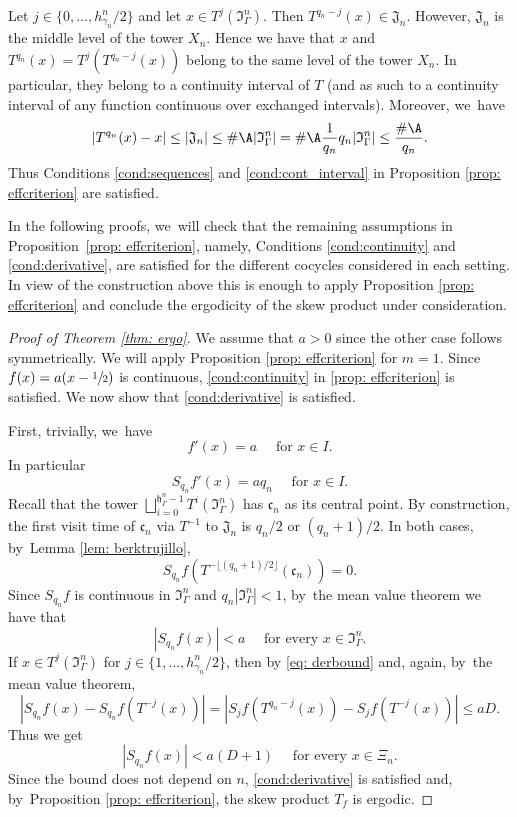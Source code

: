 Let $j\in\{0,\ldots,h_{\gamma_n}^n/2\}$ and let $x\in T^j(\mathfrak I_{\Gamma}^n)$. Then $T^{q_n-j}(x)\in \mathfrak J_n$. However, $\mathfrak J_n$ is the middle level of the tower $X_n$. Hence we have that $x$
and $T^{q_n}(x)=T^{j}(T^{q_n-j}(x))$ belong to the same level of the tower $X_n$. In particular, they belong to a continuity interval of $T$ (and as such to a continuity interval of any function continuous over exchanged intervals). Moreover, we~have
\[
|T^{q_n}(x)-x|\le |\mathfrak J_n|\le \#\A|\mathfrak I_{\Gamma}^n|=
\#\A\frac{1}{q_n} q_n|\mathfrak I_{\Gamma}^n|\le \frac{\#\A}{q_n}.
\]
Thus Conditions \eqref{cond:sequences} and \eqref{cond:cont_interval} in Proposition \ref{prop: effcriterion} are satisfied.

In the following proofs, we~will check that the remaining assumptions in Proposition~\ref{prop: effcriterion}, namely, Conditions \eqref{cond:continuity} and \eqref{cond:derivative}, are satisfied for the different cocycles considered in each setting. In view of the construction above this is enough to apply Proposition \ref{prop: effcriterion} and conclude the ergodicity of the skew product under consideration.

\begin{proof}[Proof of Theorem \ref{thm: ergo}]
We assume that $a>0$ since the other case follows symmetrically. We will apply Proposition \ref{prop: effcriterion} for $m=1$. Since $f(x)=a(x-\sfrac{1}{2})$ is continuous, \eqref{cond:continuity} in \ref{prop: effcriterion} is satisfied. We now show that \eqref{cond:derivative} is satisfied.

First, trivially, we~have
\[
f'(x)=a\quad\text{ for }x\in I.
\]
In particular
\[
S_{q_n} f'(x)=aq_n\quad \text{ for }x\in I.
\]
Recall that the tower $\bigsqcup_{i=0}^{\mathfrak h_{\Gamma}^n-1}T^i(\mathfrak I_{\Gamma}^n)$ has $\mathfrak c_n$ as its central point. By construction, the first visit time of $\mathfrak c_n$ via $T^{-1}$ to $\mathfrak J_n$ is $q_{n}/2$ or $(q_n+1)/2$. In both cases, by~Lemma \ref{lem: berktrujillo},
\[
S_{q_n}f(T^{-\lfloor (q_n+1)/2\rfloor}(\mathfrak c_n))=0.
\]
Since $S_{q_n}f$ is continuous in $\mathfrak I_{\Gamma}^n$ and $q_n|\mathfrak I_{\Gamma}^n|<1$, by~the mean value theorem we have that
\[
\left|S_{q_n}f(x)\right|<a\quad \text{ for every }x\in \mathfrak I_{\Gamma}^n.
\]
If $x\in T^j(\mathfrak I_{\Gamma}^n)$ for $j\in \{1,\ldots,h_{\gamma_n}^n/2\}$, then by \eqref{eq: derbound} and, again, by~the mean value theorem,
\[
\left|S_{q_n}f(x)-S_{q_n}f(T^{-j}(x)) \right|=
\left|S_j f(T^{q_n-j}(x))-S_j f(T^{-j}(x)) \right|
\le a D.
\]
Thus we get
\[
\left|S_{q_n}f(x)\right|<a(D+1) \quad \text{ for every }x\in\Xi_n.
\]
Since the bound does not depend on $n$, \eqref{cond:derivative} is satisfied and, by~Proposition \ref{prop: effcriterion}, the skew product $T_f$ is ergodic.
\end{proof}
